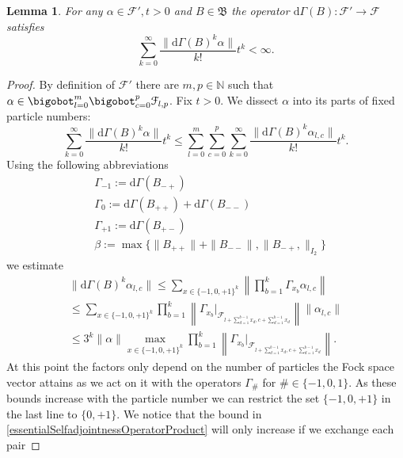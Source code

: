\documentclass[b5paper,draft,openbib,12pt]{memoir}
\newtheorem{Lemma}[Def]{Lemma}
\begin{document}
\begin{Lemma}\label{Gamma exponential bound}
For any \( \alpha \in \mathcal{F}', t>0\) and \(B\in \mathfrak{B}\) the operator \(\mathrm{d}\Gamma(B):\mathcal{F}'\rightarrow \mathcal{F}\) satisfies
\begin{equation}
\sum_{k=0}^\infty \frac{\|\mathrm{d}\Gamma(B)^k \alpha\|}{k!} t^k <\infty.
\end{equation}
\end{Lemma}
\begin{proof}
 By definition of \(\mathcal{F}'\) there are \(m,p\in\mathbb{N}\) such that \(\alpha \in \bigobot_{l=0}^m\bigobot_{c=0}^p \mathcal{F}_{l,p}\). Fix \(t>0\). 
We dissect \(\alpha\) into its parts of fixed particle numbers:
\begin{equation}
\sum_{k=0}^\infty \frac{\|\mathrm{d}\Gamma(B)^k \alpha\|}{k!} t^k \le \sum_{l=0}^m\sum_{c=0}^p \sum_{k=0}^\infty \frac{\|\mathrm{d}\Gamma(B)^k \alpha_{l,c}\|}{k!} t^k .
\end{equation}
 Using the following abbreviations
\begin{align}
&\Gamma_{-1}:=\mathrm{d}\Gamma(B_{-+})\\
&\Gamma_0:=\mathrm{d}\Gamma(B_{++})+\mathrm{d}\Gamma(B_{--})\\
&\Gamma_{+1}:=\mathrm{d}\Gamma(B_{+-})\\
&\beta:=\max\{\|B_{++}\|+\|B_{--}\|,\|B_{-+},\|_{I_2}\}
\end{align}
we estimate
\begin{align}\nonumber
\|\mathrm{d}\Gamma(B)^k \alpha_{l,c}\|\le \sum_{x\in \{-1,0,+1\}^k} \left\| \prod_{b=1}^k \Gamma_{x_b}\alpha_{l,c}\right\|\\
\le  \sum_{x\in \{-1,0,+1\}^k} \prod_{b=1}^k \left\| \Gamma_{x_b}|_{\mathcal{F}_{l+\sum_{d=1}^{b-1} x_d,c+\sum_{d=1}^{b-1} x_d}}\right\| \|\alpha_{l,c}\|\\\label{essentialSelfadjointnessOperatorProduct}
\le 3^k \|\alpha\| \max_{x\in \{-1,0,+1\}^k} \prod_{b=1}^k\left\| \Gamma_{x_b}|_{\mathcal{F}_{l+\sum_{d=1}^{b-1} x_d,c+\sum_{d=1}^{b-1} x_d}}\right\|  .
\end{align}
At this point the factors only depend on the number of particles the Fock space 
vector attains as we act on it with the operators \(\Gamma_{\#}\) for 
\(\#\in \{-1,0,1\}\). 
As these bounds increase with the particle number we can restrict the set 
\(\{-1,0,+1\}\) in the last line to \(\{0,+1\}\).
We notice that the bound in \eqref{essentialSelfadjointnessOperatorProduct} 
will only increase if  we exchange each pair 

\end{proof}
\end{document}

